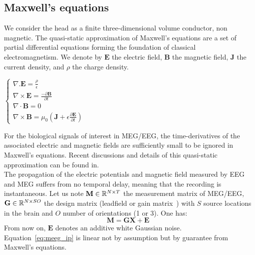 \subsection*{Maxwell's equations}
We consider the head as a finite three-dimensional volume conductor, non magnetic. The quasi-static approximation of Maxwell's equations are a set of partial differential equations forming the foundation of classical electromagnetism. We denote by $\mathbf{E}$ the electric field, $\mathbf{B}$ the magnetic field, $\mathbf{J}$ the current density, and $\rho$ the charge density.

\begin{center}
$\left\{
\begin{array}{l}
  \nabla . \mathbf{E} = \frac{\rho}{\epsilon} \\
  \nabla \times \mathbf{E} = \frac{-\partial \mathbf{B}}{\partial t} \\
  \nabla \cdot \mathbf{B} = 0 \\
  \nabla \times \mathbf{B} = \mu_0 (\mathbf{J} + \epsilon\frac{\partial \mathbf{E}}{\partial t})
\end{array}
\right.$
\end{center}

For the biological signals of interest in MEG/EEG, the time-derivatives of the associated electric and magnetic fields are sufficiently small to be ignored in Maxwell’s equations. Recent discussions and details of this quasi-static approximation can be found in\cite{hamalainen1993magnetoencephalography,tripp1983physical,heller1992brain}.\\

The propagation of the electric potentials and magnetic field measured by EEG and MEG suffers from no temporal delay, meaning that the recording is instantaneous. Let us note $\mathbf{M}\in\mathbb{R}^{N\times T}$ the measurement matrix of MEG/EEG, $\mathbf{G}\in\mathbb{R}^{N\times SO}$ the design matrix (leadfield or gain matrix~\cite{h1994}) with $S$ source locations in the brain and $O$ number of orientations (1 or 3). One has:
\begin{equation}
\mathbf{M} = \mathbf{GX}+\mathbf{E}
\end{equation} \label{eq:meeg_ip}
\noindent From now on, $\mathbf{E}$ denotes an additive white Gaussian noise. Equation~\eqref{eq:meeg_ip} is linear not by assumption but by guarantee from Maxwell's equations.\\

